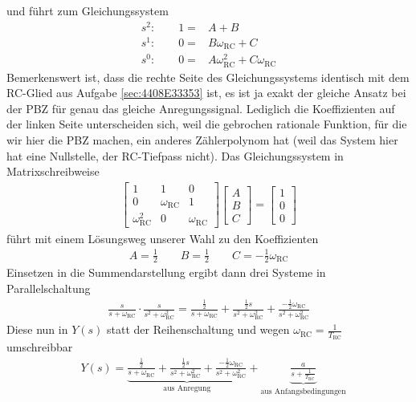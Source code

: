 \begin{Loesung}
und führt zum Gleichungssystem
\begin{align}
s^2: \qquad 1 =& A + B\\
s^1: \qquad 0 =& B \omega_\mathrm{RC} + C\\
s^0: \qquad 0 =& A \omega_\mathrm{RC}^2 + C \omega_\mathrm{RC}
\end{align}
Bemerkenswert ist, dass die rechte Seite des Gleichungssystems identisch mit dem RC-Glied aus Aufgabe \ref{sec:4408E33353} ist, es ist ja exakt der gleiche Ansatz bei der PBZ für genau das gleiche Anregungssignal. Lediglich die Koeffizienten auf der linken Seite unterscheiden sich, weil die gebrochen rationale Funktion, für die wir hier die PBZ machen, ein anderes Zählerpolynom hat (weil das System hier hat eine Nullstelle, der RC-Tiefpass nicht).
%
Das Gleichungssystem in Matrixschreibweise
\begin{align}
\begin{bmatrix}
1 & 1 & 0\\
0 & \omega_\mathrm{RC} & 1\\
\omega_\mathrm{RC}^2 & 0 & \omega_\mathrm{RC}
\end{bmatrix}
\begin{bmatrix}
A\\B\\C
\end{bmatrix}
=
\begin{bmatrix}
1\\0\\0
\end{bmatrix}
\end{align}
führt mit einem Lösungsweg unserer Wahl zu den Koeffizienten
\begin{align}
A = \frac{1}{2}\qquad B = \frac{1}{2}\qquad C = -\frac{1}{2} \omega_\mathrm{RC}
\end{align}
Einsetzen in die Summendarstellung ergibt dann drei Systeme in Parallelschaltung
\begin{align}
\frac{s}{s + \omega_\text{RC}} \cdot \frac{s}{s^2+\omega_\text{RC}^2} =
\frac{\frac{1}{2}}{s + \omega_\text{RC}} + \frac{\frac{1}{2}s}{s^2+\omega_\text{RC}^2} + \frac{-\frac{1}{2} \omega_\mathrm{RC}}{s^2+\omega_\text{RC}^2}
\end{align}
Diese nun in $Y(s)$ statt der Reihenschaltung und wegen $\omega_\text{RC} = \frac{1}{T_\text{RC}}$ umschreibbar
\begin{align}
&Y(s) = \underbrace{\frac{\frac{1}{2}}{s + \omega_\text{RC}} + \frac{\frac{1}{2}s}{s^2+\omega_\text{RC}^2} + \frac{-\frac{1}{2} \omega_\mathrm{RC}}{s^2+\omega_\text{RC}^2}}_{\text{aus Anregung}} + \underbrace{\frac{a}{s + \frac{1}{T_\text{RC}}}}_{\text{aus Anfangsbedingungen}}\\

\end{align}
\end{Loesung}
